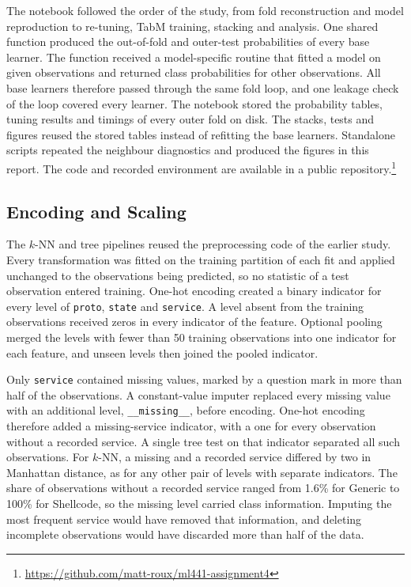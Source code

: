 \documentclass[conference]{IEEEtran}
\newcommand{\knn}{\mbox{$k$-NN}}
\begin{document}
The notebook followed the order of the study, from fold reconstruction and model reproduction to re-tuning, TabM training, stacking and analysis. One shared function produced the out-of-fold and outer-test probabilities of every base learner. The function received a model-specific routine that fitted a model on given observations and returned class probabilities for other observations. All base learners therefore passed through the same fold loop, and one leakage check of the loop covered every learner. The notebook stored the probability tables, tuning results and timings of every outer fold on disk. The stacks, tests and figures reused the stored tables instead of refitting the base learners. Standalone scripts repeated the neighbour diagnostics and produced the figures in this report. The code and recorded environment are available in a public repository.\footnote{\url{https://github.com/matt-roux/ml441-assignment4}}

\subsection{Encoding and Scaling}
The \knn{} and tree pipelines reused the preprocessing code of the earlier study. Every transformation was fitted on the training partition of each fit and applied unchanged to the observations being predicted, so no statistic of a test observation entered training. One-hot encoding created a binary indicator for every level of \texttt{proto}, \texttt{state} and \texttt{service}. A level absent from the training observations received zeros in every indicator of the feature. Optional pooling merged the levels with fewer than 50 training observations into one indicator for each feature, and unseen levels then joined the pooled indicator.

Only \texttt{service} contained missing values, marked by a question mark in more than half of the observations. A constant-value imputer replaced every missing value with an additional level, \texttt{\_\_missing\_\_}, before encoding. One-hot encoding therefore added a missing-service indicator, with a one for every observation without a recorded service. A single tree test on that indicator separated all such observations. For \knn{}, a missing and a recorded service differed by two in Manhattan distance, as for any other pair of levels with separate indicators. The share of observations without a recorded service ranged from 1.6\% for Generic to 100\% for Shellcode, so the missing level carried class information. Imputing the most frequent service would have removed that information, and deleting incomplete observations would have discarded more than half of the data.
\end{document}
